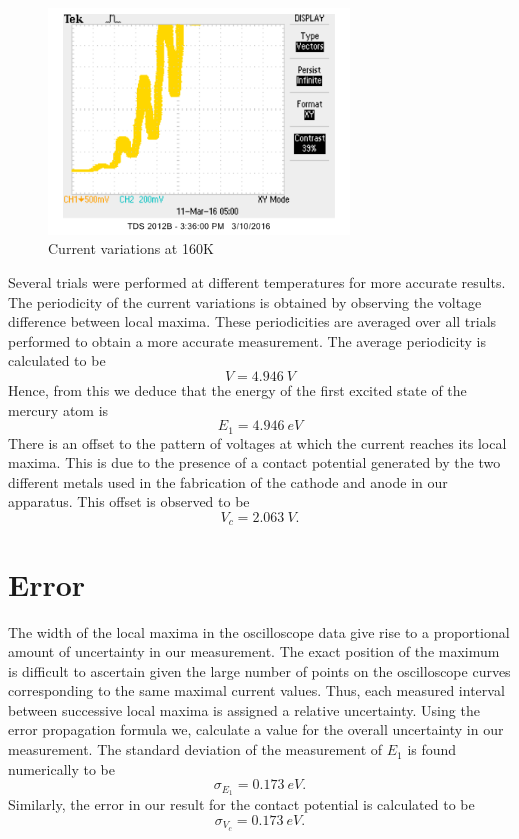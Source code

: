 \documentclass[aps, reprint,amsmath,amssymb]{revtex4-1} %
\begin{document}
\begin{figure}
\centering
\includegraphics[width=8cm]{jb_mp_160.png}
\caption{Current variations at 160K}
\label{fig:160}
\end{figure}

Several trials were performed at different temperatures for more accurate results. The periodicity of the current variations is obtained by observing the voltage difference between local maxima. These periodicities are averaged over all trials performed to obtain a more accurate measurement. The average periodicity is calculated to be
\[
	V =  \SI{4.946}{V}
\]
Hence, from this we deduce that the energy of the first excited state of the mercury atom is
\[
	E_1 =  \SI{4.946}{eV}
\]
There is an offset to the pattern of voltages at which the current reaches its local maxima. This is due to the presence of a contact potential generated by the two different metals used in the fabrication of the cathode and anode in our apparatus. This offset is observed to be 
\[
	V_c = \SI{2.063}{V}.
\]

\section{Error}

The width of the local maxima in the oscilloscope data give rise to a proportional amount of uncertainty in our measurement. The exact position of the maximum is difficult to ascertain given the large number of points on the oscilloscope curves corresponding to the same maximal current values. Thus, each measured interval between successive local maxima is assigned a relative uncertainty. Using the error propagation formula we, calculate a value for the overall uncertainty in our measurement. The standard deviation of the measurement of $E_1$ is found numerically to be
\[
    \sigma_{E_1} = \SI{0.173}{eV}.
\]
Similarly, the error in our result for the contact potential is calculated to be
\[
    \sigma_{V_c} = \SI{0.173}{eV}.
\]
\end{document}
